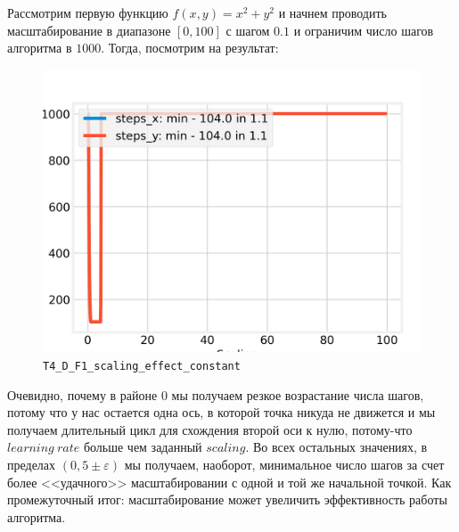 \documentclass[12pt, a4paper, oneside, final]{article}
\begin{document}
	Рассмотрим первую функцию $f(x, y) = x^2 + y^2$ и начнем проводить масштабирование в диапазоне $[0, 100]$ с шагом $0.1$ и ограничим число шагов алгоритма в $1000$. Тогда, посмотрим на результат:
	\begin{figure}[H]
		\centering
		\includegraphics[scale=0.68]{Image/T4_D_F1_scaling_effect_constant.png}
		\caption*{\texttt{T4\_D\_F1\_scaling\_effect\_constant}}
	\end{figure}
	Очевидно, почему в районе $0$ мы получаем резкое возрастание числа шагов, потому что у нас остается одна ось, в которой точка никуда не движется и мы получаем длительный цикл для схождения второй оси к нулю, потому-что $learning~rate$ больше чем заданный $scaling$. Во всех остальных значениях, в пределах $(0, 5 \pm \varepsilon)$ мы получаем, наоборот, минимальное число шагов за счет более <<удачного>> масштабировании с одной и той же начальной точкой. Как промежуточный итог: масштабирование может увеличить эффективность работы алгоритма.
\end{document}
